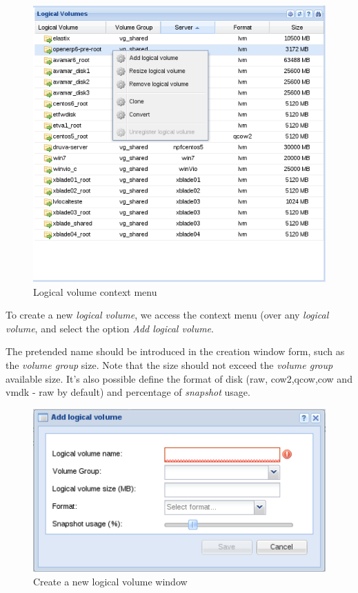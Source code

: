\begin{figure}[H]
        \begin{center}
        \includegraphics[scale=0.45]{screenshots/node_storage_lv_ctx.png}
        \caption{Logical volume context menu}
        \label{fig:storage_lv_ctx}
        \end{center}
\end{figure}

To create a new \emph{logical volume}, we access the context menu (over any \emph{logical volume}, and select the option \emph{Add logical volume}.

The pretended name should be introduced in the creation window form, such as the \emph{volume group} size. Note that the size should not exceed the \emph{volume group} available size.
It's also possible define the format of disk (raw, cow2,qcow,cow and vmdk - raw by default) and percentage of \emph{snapshot} usage.

\begin{figure}[H]
        \begin{center}
        \includegraphics[scale=0.5]{screenshots/storage_lv_create.png}
        \caption{Create a new logical volume window}
        \label{fig:storage_lv_create}
        \end{center}
\end{figure}

